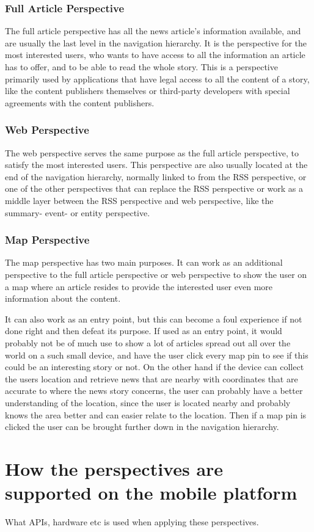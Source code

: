\subsubsection{Full Article Perspective}
The full article perspective has all the news article's information available, and are usually the last level in the navigation hierarchy. It is the perspective for the most interested users, who wants to have access to all the information an article has to offer, and to be able to read the whole story. This is a perspective primarily used by applications that have legal access to all the content of a story, like the content publishers themselves or third-party developers with special agreements with the content publishers.

\subsubsection{Web Perspective}
The web perspective serves the same purpose as the full article perspective, to satisfy the most interested users. This perspective are also usually located at the end of the navigation hierarchy, normally linked to from the RSS perspective, or one of the other perspectives that can replace the RSS perspective or work as a middle layer between the RSS perspective and web perspective, like the summary- event- or entity perspective.


\subsubsection{Map Perspective}
The map perspective has two main purposes. It can work as an additional perspective to the full article perspective or web perspective to show the user on a map where an article resides to provide the interested user even more information about the content.

It can also work as an entry point, but this can become a foul experience if not done right and then defeat its purpose. If used as an entry point, it would probably not be of much use to show a lot of articles spread out all over the world on a such small device, and have the user click every map pin to see if this could be an interesting story or not. On the other hand if the device can collect the users location and retrieve news that are nearby with coordinates that are accurate to where the news story concerns, the user can probably have a better understanding of the location, since the user is located nearby and probably knows the area better and can easier relate to the location. Then if a map pin is clicked the user can be brought further down in the navigation hierarchy.


\section{How the perspectives are supported on the mobile platform}
What APIs, hardware etc is used when applying these perspectives.